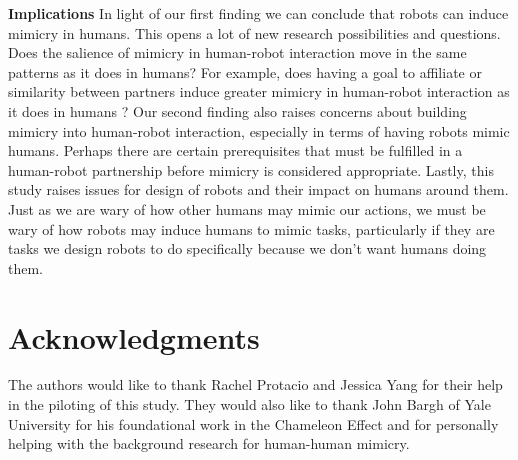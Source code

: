 \documentclass{acm_proc_article-sp}
\begin{document}
\textbf{Implications}
In light of our first finding we can conclude that robots can induce mimicry in humans. This opens a lot of new research possibilities and questions. Does the salience of mimicry in human-robot interaction move in the same patterns as it does in humans? For example, does having a goal to affiliate or similarity between partners induce greater mimicry in human-robot interaction as it does in humans \cite{chartrand2013antecedents}? Our second finding also raises concerns about building mimicry into human-robot interaction, especially in terms of having robots mimic humans. Perhaps there are certain prerequisites that must be fulfilled in a human-robot partnership before mimicry is considered appropriate. Lastly, this study raises issues for design of robots and their impact on humans around them. Just as we are wary of how other humans may mimic our actions, we must be wary of how robots may induce humans to mimic tasks, particularly if they are tasks we design robots to do specifically because we don't want humans doing them.

\section{Acknowledgments}
The authors would like to thank Rachel Protacio and Jessica Yang for their help in the piloting of this study. They would also like to thank John Bargh of Yale University for his foundational work in the Chameleon Effect and for personally helping with the background research for human-human mimicry.

%

%
\end{document}
